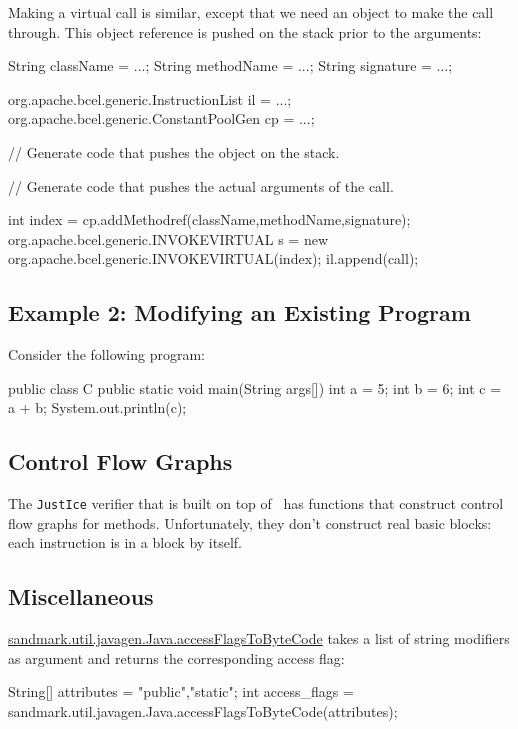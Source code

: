 Making a virtual call is similar, except that we
need an object to make the call through. This
object reference is pushed on the stack prior
to the arguments:
\begin{listing}{1}
   String className  = ...;
   String methodName = ...;
   String signature  = ...;

   org.apache.bcel.generic.InstructionList il = ...;
   org.apache.bcel.generic.ConstantPoolGen cp = ...;

   // Generate code that pushes the object on the stack.

   // Generate code that pushes the actual arguments of the call.

   int index = cp.addMethodref(className,methodName,signature);
   org.apache.bcel.generic.INVOKEVIRTUAL s = 
       new org.apache.bcel.generic.INVOKEVIRTUAL(index);
   il.append(call);
\end{listing}


\subsection{Example 2: Modifying an Existing Program}
Consider the following program:
\begin{listing}{1}
   public class C {
      public static void main(String args[]) {
         int a = 5;
         int b = 6;
         int c = a + b;
         System.out.println(c);
      }
   }
\end{listing}


\subsection{Control Flow Graphs}
The {\tt JustIce} verifier that is built on top of
\BCEL\ has functions that construct control flow
graphs for methods. Unfortunately, they don't 
construct real basic blocks: each instruction is
in a block by itself.

\subsection{Miscellaneous}
\url{sandmark.util.javagen.Java.accessFlagsToByteCode}
takes a list of string modifiers
as argument and returns the corresponding access flag:
\begin{listing}{1}
   String[] attributes = {"public","static"};
   int access_flags = 
      sandmark.util.javagen.Java.accessFlagsToByteCode(attributes);
\end{listing}
